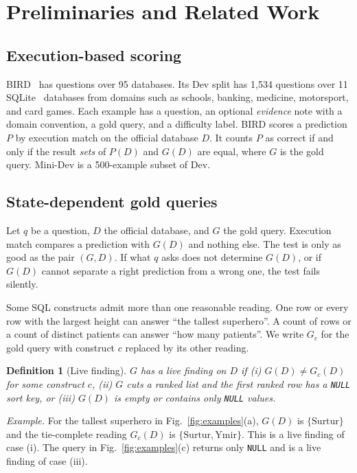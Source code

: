 \documentclass[conference]{IEEEtran}
\newtheorem{definition}{Definition}
\begin{document}
\section{Preliminaries and Related Work}
\label{sec:prelim}

\subsection{Execution-based scoring}
BIRD~\cite{li2024bird} has questions over 95 databases. Its Dev split has 1,534
questions over 11 SQLite~\cite{gaffney2022sqlite} databases from domains such as
schools, banking, medicine, motorsport, and card games. Each example has a
question, an optional \emph{evidence} note with a domain convention, a gold
query, and a difficulty label. BIRD scores a prediction $P$ by execution match
on the official database $D$. It counts $P$ as correct if and only if the result
\emph{sets} of $P(D)$ and $G(D)$ are equal, where $G$ is the gold query.
Mini-Dev is a 500-example subset of Dev.

\subsection{State-dependent gold queries}
\label{sec:problem}
Let $q$ be a question, $D$ the official database, and $G$ the gold query.
Execution match compares a prediction with $G(D)$ and nothing else. The test is
only as good as the pair $(G, D)$. If what $q$ asks does not determine $G(D)$,
or if $G(D)$ cannot separate a right prediction from a wrong one, the test fails
silently.

Some SQL constructs admit more than one reasonable reading. One row or every
row with the largest height can answer ``the tallest superhero''. A count of rows
or a count of distinct patients can answer ``how many patients''. We write $G_c$
for the gold query with construct $c$ replaced by its other reading.

\begin{definition}[Live finding]
$G$ has a live finding on $D$ if (i) $G(D) \neq G_c(D)$ for some construct
$c$, (ii) $G$ cuts a ranked list and the first ranked row has a \texttt{NULL}
sort key, or (iii) $G(D)$ is empty or contains only \texttt{NULL} values.
\end{definition}

\emph{Example.} For the tallest superhero in Fig.~\ref{fig:examples}(a), $G(D)$
is $\{\text{Surtur}\}$ and the tie-complete reading $G_c(D)$ is
$\{\text{Surtur}, \text{Ymir}\}$. This is a live finding of case (i). The query
in Fig.~\ref{fig:examples}(c) returns only \texttt{NULL} and is a live finding
of case (iii).
\end{document}
